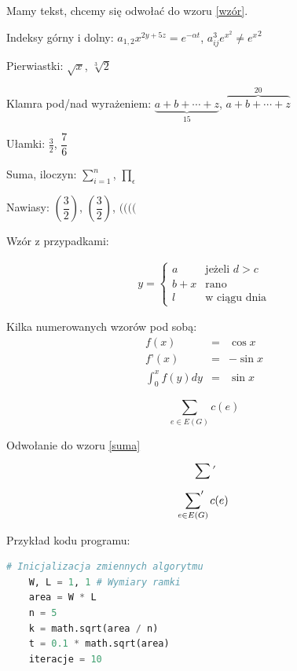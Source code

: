\documentclass[12pt,a4paper,twoside]{report}
\theoremstyle{definition} %
\begin{document}
	
	
	Mamy tekst, chcemy się odwołać do wzoru \eqref{wzór}.
	
	
	Indeksy górny i dolny: $a_{1,2} x^{2y+5z}=e^{-\alpha t}$, $
	a^{3}_{ij} e^{x^2} \neq {e^x}^2$
	\vspace{1cm}
	
	Pierwiastki: $\sqrt{x}$, $\sqrt[3]{2} $
	
	\vspace{1cm}
	Klamra pod/nad wyrażeniem: $\underbrace{ a+b+\cdots+z }_{15}$, $\overbrace{ a+b+\cdots+z }^{20}$
	
	\vspace{1cm}
	
	Ułamki: $\frac{3}{2}$, $\dfrac{7}{6}$
	
	\vspace{1cm}
	
	Suma, iloczyn: $\sum\limits_{i=1}^n$, $\prod\limits_\epsilon$
	
	
	
	Nawiasy: $(\dfrac{3}{2})$, $\left(\dfrac{3}{2}\right)$, $\big( \Big( \bigg( \Bigg($
	
	Wzór z przypadkami:
	
	\begin{align*}
		y = \left\{ \begin{array}{ll}
			a & \textrm{jeżeli $d>c$}\\
			b+x & \textrm{rano}\\
			l & \textrm{w~ciągu dnia}
		\end{array} \right.
	\end{align*}
	
	Kilka numerowanych wzorów pod sobą:
	\begin{eqnarray}
		f(x) & = & \cos x \\
		f’(x) & = & -\sin x \\
		\int_{0}^{x} f(y)dy &
		= & \sin x
	\end{eqnarray}
	
	\begin{equation}\label{suma}
		\sum\limits_{e\in E(G)}c(e)
	\end{equation}
	
	Odwołanie do wzoru \eqref{suma}
	
	$$ \sum\nolimits'$$
	
	$$\sideset{}{'}\sum_{e\in E(G)} c(e)$$
	
	Przykład kodu programu:	
    \begin{lstlisting}[language=Python,caption=Wyznaczenie przykładowej ramki,label={}]
	# Inicjalizacja zmiennych algorytmu
	W, L = 1, 1 # Wymiary ramki
	area = W * L
	n = 5
	k = math.sqrt(area / n)
	t = 0.1 * math.sqrt(area)
	iteracje = 10\end{lstlisting}
\end{document}
